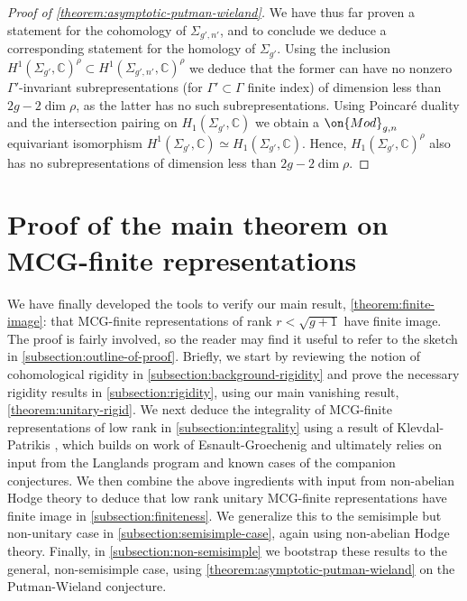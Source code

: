 \documentclass[12 pt]{amsart}
\theoremstyle{plain}
\theoremstyle{definition}
\theoremstyle{remark}
\numberwithin{equation}{section}
\begin{document}
\begin{proof}[Proof of \autoref{theorem:asymptotic-putman-wieland}]
We have  thus far proven a statement for the cohomology of $\Sigma_{g',n'}$, and to
conclude we deduce a corresponding statement for the homology of $\Sigma_{g'}$.
Using the inclusion 
$H^1(\Sigma_{g'}, \mathbb C)^\rho \subset H^1(\Sigma_{g', n'}, \mathbb{C})^\rho$
we deduce that the former can have no nonzero $\Gamma'$-invariant subrepresentations 
(for $\Gamma' \subset \Gamma$ finite index)
of dimension less than $2g - 2\dim \rho$, as the latter has no such 
subrepresentations.
Using Poincar\'e duality and the intersection pairing on $H_1(\Sigma_{g'}, \mathbb C)$ 
we obtain a $\on{Mod}_{g,n}$ equivariant isomorphism
$H^1(\Sigma_{g'},\mathbb C) \simeq H_1(\Sigma_{g'},\mathbb C)$.
Hence, $H_1(\Sigma_{g'}, \mathbb C)^\rho$ also has no subrepresentations of 
dimension less than $2g - 2\dim\rho$.
\end{proof}





\section{Proof of the main theorem on MCG-finite representations}
\label{section:main-proof}

We have finally developed the tools to verify our main result, \autoref{theorem:finite-image}: that  MCG-finite representations of rank $r<\sqrt{g+1}$ have finite image.
The proof is fairly involved, so the reader may find it useful to refer to the sketch in \autoref{subsection:outline-of-proof}. Briefly, we 
start by reviewing the notion of cohomological rigidity in
\autoref{subsection:background-rigidity}
and prove the necessary rigidity results in
\autoref{subsection:rigidity}, using our main vanishing result,
\autoref{theorem:unitary-rigid}.
We next deduce the integrality of MCG-finite representations of low rank in
\autoref{subsection:integrality}
using a result of 
Klevdal-Patrikis \cite{klevdalP:g-rigid-local-systems-are-integral}, which builds on work of Esnault-Groechenig \cite{esnault2018cohomologically} and ultimately relies on input from the Langlands program and known cases of the companion conjectures.
We then combine the above ingredients with input from non-abelian Hodge theory to deduce that low rank unitary MCG-finite representations
have finite image in \autoref{subsection:finiteness}.
We generalize this to the semisimple but non-unitary case in
\autoref{subsection:semisimple-case}, again using non-abelian Hodge theory.
Finally, in \autoref{subsection:non-semisimple} we bootstrap these results to the general, non-semisimple case,
using \autoref{theorem:asymptotic-putman-wieland} on the Putman-Wieland conjecture.
\end{document}
